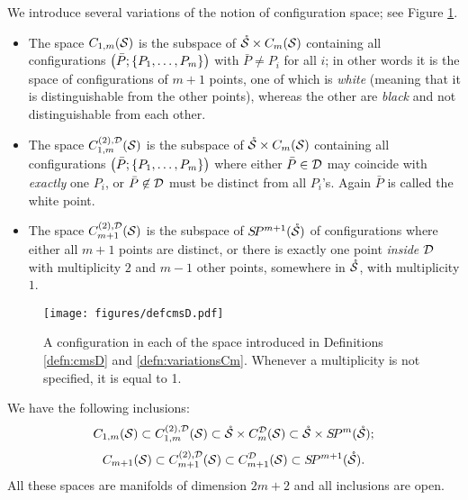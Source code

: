 \begin{defn}
\label{defn:variationsCm}
We introduce several variations of the notion of configuration space; see Figure \ref{fig:defcmsD}.
\begin{itemize} 
 \item The space $C_{1,m}(\S)$ is the subspace of $\mrS\times \cms$ containing all configurations
 $\pa{\bar P;\set{P_1,\dots,P_m}}$ with $\bar P\neq P_i$ for all $i$; in other words it is
 the space of configurations of $m+1$ points, one of which is \emph{white} (meaning that
 it is distinguishable from the other points), whereas the other are \emph{black} and not distinguishable
 from each other.
 \item The space $\fmstwoD$ is the subspace of $\mrS\times\cms$ containing all configurations
 $\pa{\bar P;\set{P_1,\dots, P_m}}$ where either $\bar P\in\D$ may coincide with \emph{exactly}
 one $P_i$, or
 $\bar P\not\in \D$ must be distinct from all $P_i$'s.
 Again $\bar P$ is called the white point.
 \item The space $\cmstwoD$ is the subspace of $\SP^{m+1}(\mrS)$ of configurations where either all $m+1$ points
 are distinct, or there is exactly one point \emph{inside $\D$} with multiplicity $2$ and $m-1$ other points,
 somewhere in $\mrS$, with multiplicity $1$.
\end{itemize}
 \end{defn}
 
\begin{figure}\centering
 \texttt{[image: figures/defcmsD.pdf]}
 \caption{A configuration in each of the space introduced in Definitions \ref{defn:cmsD} and \ref{defn:variationsCm}.
 Whenever a multiplicity is not specified, it is equal to 1.}
\label{fig:defcmsD}
\end{figure}

 
We have the following inclusions:
\[
C_{1,m}(\S)\subset\fmstwoD\subset\mrS\times\cmsD\subset\mrS\times\SP^m(\mrS);
\]
\[
C_{m+1}(\S)\subset\cmstwoD\subset C_{m+1}^{\D}(\S)\subset\SP^{m+1}(\mrS).
\]
All these spaces are
manifolds of dimension $2m+2$ and all inclusions are open.

